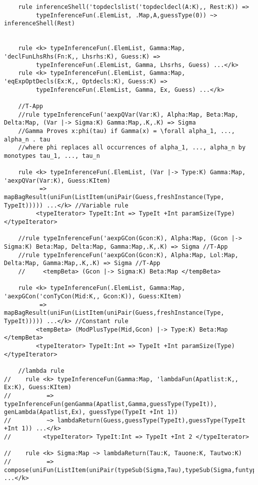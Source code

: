\begin{lstlisting}
    rule inferenceShell('topdeclslist('topdecldecl(A:K),, Rest:K)) =>
         typeInferenceFun(.ElemList, .Map,A,guessType(0)) ~> inferenceShell(Rest)


    rule <k> typeInferenceFun(.ElemList, Gamma:Map, 'declFunLhsRhs(Fn:K,, Lhsrhs:K), Guess:K) =>
         typeInferenceFun(.ElemList, Gamma, Lhsrhs, Guess) ...</k>
    rule <k> typeInferenceFun(.ElemList, Gamma:Map, 'eqExpOptDecls(Ex:K,, Optdecls:K), Guess:K) =>
         typeInferenceFun(.ElemList, Gamma, Ex, Guess) ...</k>

    //T-App
    //rule typeInferenceFun('aexpQVar(Var:K), Alpha:Map, Beta:Map, Delta:Map, (Var |-> Sigma:K) Gamma:Map,.K,.K) => Sigma
    //Gamma Proves x:phi(tau) if Gamma(x) = \forall alpha_1, ..., alpha_n . tau
    //where phi replaces all occurrences of alpha_1, ..., alpha_n by monotypes tau_1, ..., tau_n

    rule <k> typeInferenceFun(.ElemList, (Var |-> Type:K) Gamma:Map, 'aexpQVar(Var:K), Guess:KItem)
          => mapBagResult(uniFun(ListItem(uniPair(Guess,freshInstance(Type, TypeIt))))) ...</k> //Variable rule
         <typeIterator> TypeIt:Int => TypeIt +Int paramSize(Type) </typeIterator>

    //rule typeInferenceFun('aexpGCon(Gcon:K), Alpha:Map, (Gcon |-> Sigma:K) Beta:Map, Delta:Map, Gamma:Map,.K,.K) => Sigma //T-App
    //rule typeInferenceFun('aexpGCon(Gcon:K), Alpha:Map, Lol:Map, Delta:Map, Gamma:Map,.K,.K) => Sigma //T-App
    //     <tempBeta> (Gcon |-> Sigma:K) Beta:Map </tempBeta>

    rule <k> typeInferenceFun(.ElemList, Gamma:Map, 'aexpGCon('conTyCon(Mid:K,, Gcon:K)), Guess:KItem)
          => mapBagResult(uniFun(ListItem(uniPair(Guess,freshInstance(Type, TypeIt))))) ...</k> //Constant rule
         <tempBeta> (ModPlusType(Mid,Gcon) |-> Type:K) Beta:Map </tempBeta>
         <typeIterator> TypeIt:Int => TypeIt +Int paramSize(Type) </typeIterator>

    //lambda rule
//    rule <k> typeInferenceFun(Gamma:Map, 'lambdaFun(Apatlist:K,, Ex:K), Guess:KItem) 
//          => typeInferenceFun(genGamma(Apatlist,Gamma,guessType(TypeIt)), genLambda(Apatlist,Ex), guessType(TypeIt +Int 1))
//          ~> lambdaReturn(Guess,guessType(TypeIt),guessType(TypeIt +Int 1)) ...</k>
//         <typeIterator> TypeIt:Int => TypeIt +Int 2 </typeIterator>

//    rule <k> Sigma:Map ~> lambdaReturn(Tau:K, Tauone:K, Tautwo:K) 
//          => compose(uniFun(ListItem(uniPair(typeSub(Sigma,Tau),typeSub(Sigma,funtype(Tauone,Tautwo))))),Sigma) ...</k>


\end{lstlisting}
